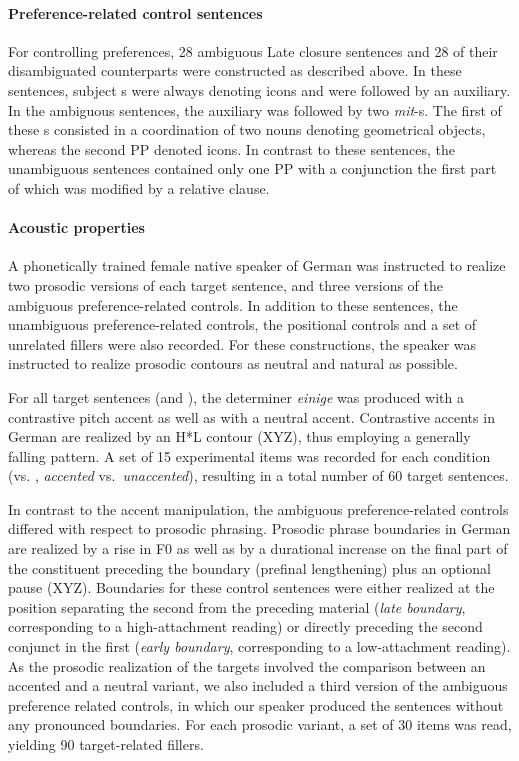 \documentclass[fleqn,reqno,10pt,draft]{article}
\newcommand{\as}{\acro{as}}
\renewcommand{\es}{\acro{es}}
\begin{document}
\paragraph{Preference-related control sentences}
For controlling preferences, 28 ambiguous Late closure sentences and 28 
of their disambiguated counterparts were constructed as described  above.
In these sentences, subject {\small {}}s were always denoting icons and were followed
by an auxiliary. In the ambiguous sentences, the auxiliary was followed by two {\it mit}-{\small {}}s.
The first of these {\small {}}s consisted in a coordination of two nouns denoting geometrical 
objects, whereas the second PP denoted icons. In contrast to these 
sentences, the unambiguous sentences contained only one PP with a conjunction the first part of which was 
modified by a relative clause. 



\paragraph{Acoustic properties}

A phonetically trained female native speaker of German was instructed
to realize two prosodic versions of each target sentence, and three
versions of the ambiguous preference-related controls. In addition to these
sentences, the unambiguous preference-related controls, the positional controls
and a set of unrelated fillers were also recorded. For these constructions, the speaker was instructed
to realize prosodic contours as neutral and natural as possible.

For all target sentences (\as and \es), the determiner \emph{einige} was
produced with a contrastive pitch accent as well as with a neutral
accent. Contrastive accents in German are realized by an
H*L contour (XYZ), thus employing a generally
falling pattern. A set of 15 experimental items was recorded for each
condition (\as vs. \es, \emph{accented} vs.~\emph{unaccented}), resulting in a
total number of 60 target sentences.

In contrast to the accent manipulation, the ambiguous preference-related controls
differed with respect to prosodic phrasing. Prosodic phrase boundaries
in German are realized by a rise in F0 as well as by a durational
increase on the final part of the constituent preceding the boundary
(prefinal lengthening) plus an optional pause (XYZ). Boundaries for these control sentences
were either realized at the position separating the second {\small {}}
from the preceding material (\emph{late boundary}, corresponding to a
high-attachment reading) or directly preceding the second conjunct in
the first {\small {}} (\emph{early boundary}, corresponding to a
low-attachment reading). As the prosodic realization of the targets
involved the comparison between an accented and a neutral variant, we
also included a third version of the ambiguous preference related controls, in which our
speaker produced the sentences without any pronounced
boundaries. For each prosodic variant, a set of
30 items was read, yielding 90 target-related fillers.
\end{document}
